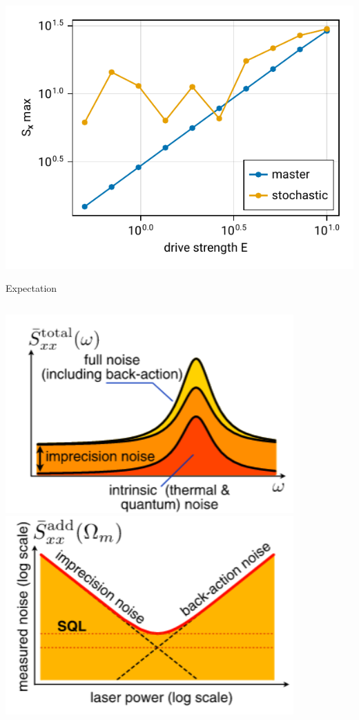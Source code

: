 \documentclass{beamer}
\begin{document}
\begin{frame}{}
	\centering
	\includegraphics{figures/05 power.pdf}
\end{frame}

\begin{frame}{Expectation}
	\begin{columns}
		\includegraphics[width=\textwidth]{figures/a.png}
		\includegraphics[width=\textwidth]{figures/b.png}
	\end{columns}
\end{frame}
\end{document}

